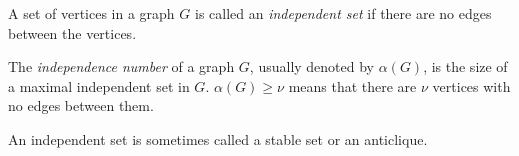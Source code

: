 \documentclass[12pt]{article}
\begin{document}
A set of vertices in a graph $G$ is called an {\em independent set} if there are no edges between the vertices.

The {\em independence number} of a graph $G$, usually denoted by $\alpha(G)$, is the size of a maximal independent set in $G$. $\alpha(G) \geq \nu$ means that there are $\nu$ vertices with no edges between them.

An independent set is sometimes called a stable set or an anticlique. 
\end{document}
